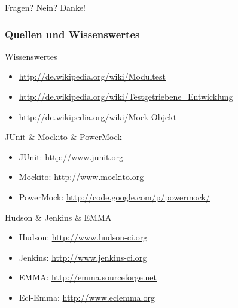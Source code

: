 \documentclass{beamer}
\begin{document}
			\begin{frame}
				Fragen? Nein? Danke!
			\end{frame}

			\begin{frame}
				\frametitle{Quellen und Wissenswertes}

				\scriptsize
				Wissenswertes
				\begin{itemize}
					\item{\url{http://de.wikipedia.org/wiki/Modultest}}
					\item{\url{http://de.wikipedia.org/wiki/Testgetriebene\_Entwicklung}}
					\item{\url{http://de.wikipedia.org/wiki/Mock-Objekt}}
				\end{itemize}

				JUnit \& Mockito \& PowerMock
				\begin{itemize}
					\item{JUnit: \url{http://www.junit.org}}
					\item{Mockito: \url{http://www.mockito.org}}
					\item{PowerMock: \url{http://code.google.com/p/powermock/}}
				\end{itemize}

				Hudson \& Jenkins \& EMMA
				\begin{itemize}
					\item{Hudson: \url{http://www.hudson-ci.org}}
					\item{Jenkins: \url{http://www.jenkins-ci.org}}
					\item{EMMA: \url{http://emma.sourceforge.net}}
					\item{Ecl-Emma: \url{http://www.eclemma.org}}
				\end{itemize}
			\end{frame}
\end{document}
